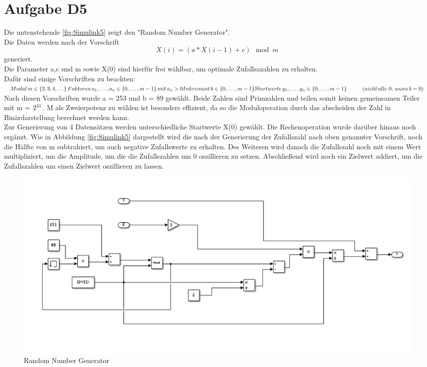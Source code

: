 
\chapter{Aufgabe D5}
Die untenstehende \autoref{fig:Simulink5} zeigt den "Random Number Generator". \\
Die Daten werden nach der Vorschrift$$ X(i) = (a*X(i-1)+c)\mod m$$ generiert.\\
Die Parameter a,c und m sowie X(0) sind hierfür frei wählbar, um optimale Zufallsazahlen zu erhalten.\\
Dafür sind einige Vorschriften zu beachten:\\ 
$ Modul \thinspace {\displaystyle m\in \{2,3,4,\ldots \}} \\
\thinspace Faktoren\thinspace {\displaystyle a_{1},\ldots ,a_{n}\in \left\{0,\ldots ,m-1\right\}}\thinspace mit \thinspace{\displaystyle a_{n}>0}\\
Inkrement\thinspace {\displaystyle b\in \left\{0,\ldots ,m-1\right\}}\\
Startwerte \thinspace{\displaystyle y_{1},\ldots ,y_{n}\in \left\{0,\ldots ,m-1\right\}} \hspace{1cm}(nicht\thinspace alle\thinspace\thinspace 0, \thinspace wenn\thinspace {\displaystyle b=0} )
$\\

Nach diesen Vorschriften wurde a = 253 und b = 89 gewählt. Beide Zahlen sind Primzahlen und teilen somit keinen gemeinsamen Teiler mit m = $2\textsuperscript{31}$.
M als Zweierpotenz zu wählen ist besonders effizient, da so die Moduloperation durch das abscheiden der Zahl in Binärdarstellung berechnet werden kann.\\
Zur Generierung von 4 Datensätzen werden unterschiedliche Startwerte X(0) gewählt.
Die Rechenoperation wurde darüber hinaus noch ergänzt. Wie in Abbildung \autoref{fig:Simulink5} dargestellt wird die nach der Generierung der Zufallszahl nach oben genannter Vorschrift, noch die Hälfte von m subtrahiert, um auch negative Zufallswerte zu erhalten. Des Weiteren wird danach die Zufallszahl noch mit einem Wert multipliziert, um die Amplitude, um die die Zufallszahlen um 0 oszillieren zu setzen. Abschließend wird noch ein Zielwert addiert, um die Zufallszahlen um einen Zielwert oszillieren zu lassen.

\begin{figure}[H]
	\centering
	\includegraphics[width=1\linewidth]{../Graphiken/Simulink5}
	\caption{Random Number Generator}
	\label{fig:Simulink5}
\end{figure}